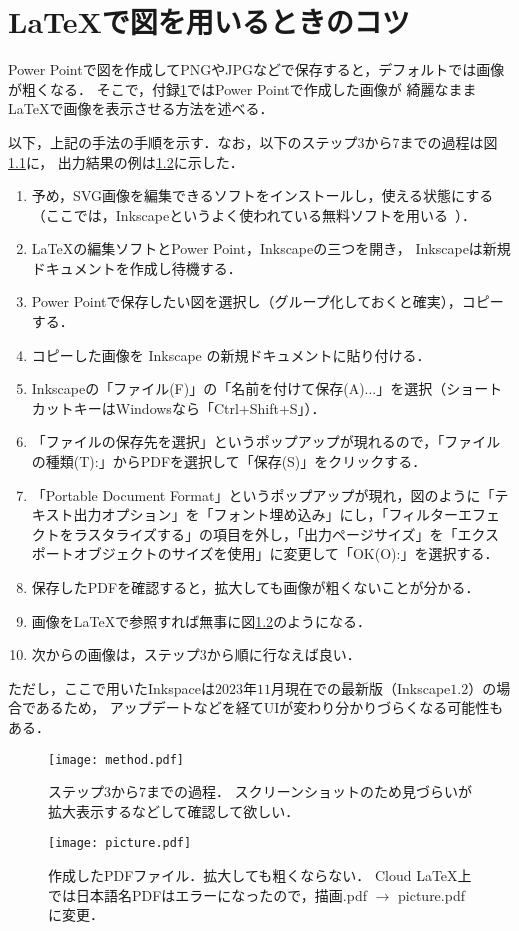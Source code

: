 \chapter{\LaTeX で図を用いるときのコツ} \label{apdx:tips}
Power Pointで図を作成してPNGやJPGなどで保存すると，デフォルトでは画像が粗くなる．
そこで，付録\ref{apdx:tips}ではPower Pointで作成した画像が
綺麗なまま\LaTeX で画像を表示させる方法を述べる．

以下，上記の手法の手順を示す．なお，以下のステップ$3$から$7$までの過程は図\ref{fig:method}に，
出力結果の例は\ref{fig:pdf}に示した．
\begin{enumerate}
    \item 予め，SVG画像を編集できるソフトをインストールし，使える状態にする
        （ここでは，Inkscapeというよく使われている無料ソフトを用いる~\cite{inkscape}）．
    \item \LaTeX の編集ソフトとPower Point，Inkscapeの三つを開き，
        Inkscapeは新規ドキュメントを作成し待機する．
    \item Power Pointで保存したい図を選択し（グループ化しておくと確実），コピーする．
    \item コピーした画像を Inkscape の新規ドキュメントに貼り付ける．
    \item Inkscapeの「ファイル(F)」の「名前を付けて保存(A)...」を選択（ショートカットキーはWindowsなら「Ctrl+Shift+S」）．
    \item 「ファイルの保存先を選択」というポップアップが現れるので，「ファイルの種類(T):」からPDFを選択して「保存(S)」をクリックする．
    \item 「Portable Document Format」というポップアップが現れ，図のように「テキスト出力オプション」を「フォント埋め込み」にし，「フィルターエフェクトをラスタライズする」の項目を外し，「出力ページサイズ」を「エクスポートオブジェクトのサイズを使用」に変更して「OK(O):」を選択する．
    \item 保存したPDFを確認すると，拡大しても画像が粗くないことが分かる．
    \item 画像を\LaTeX で参照すれば無事に図\ref{fig:pdf}のようになる．
    \item 次からの画像は，ステップ$3$から順に行なえば良い．
\end{enumerate}
ただし，ここで用いたInkspaceは$2023$年$11$月現在での最新版（Inkscape$1.2$）の場合であるため，
アップデートなどを経てUIが変わり分かりづらくなる可能性もある．

\begin{figure}[h]
  \centering
  \texttt{[image: method.pdf]}
  \caption{ステップ$3$から$7$までの過程．
  スクリーンショットのため見づらいが拡大表示するなどして確認して欲しい．}
  \label{fig:method}
\end{figure}
\begin{figure}[h]
  \centering
  \texttt{[image: picture.pdf]}
  \caption{作成したPDFファイル．拡大しても粗くならない．
  Cloud LaTeX上では日本語名PDFはエラーになったので，描画.pdf $\to$ picture.pdfに変更．}
  \label{fig:pdf}
\end{figure}
